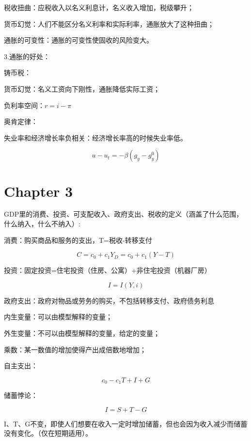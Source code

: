 \documentclass{article}
\begin{document}
税收扭曲：应税收入以名义利息计，名义收入增加，税级攀升；

货币幻觉：人们不能区分名义利率和实际利率，通胀放大了这种扭曲；

通胀的可变性：通胀的可变性使固收的风险变大。

3.通胀的好处：

铸币税：

货币幻觉：名义工资向下刚性，通胀降低实际工资；

负利率空间：$ r=i-\pi $

\hspace*{\fill}

奥肯定律：

失业率和经济增长率负相关：经济增长率高的时候失业率低。

\[
u-u_t=-\beta(g_y-g_y^0)
\]

\section{Chapter 3}

GDP里的消费、投资、可支配收入、政府支出、税收的定义（涵盖了什么范围，什么纳入，什么不纳入）:

消费：购买商品和服务的支出，T=税收-转移支付

\[
C=c_0+c_1Y_D=c_0+c_1(Y-T)
\]

投资：固定投资=住宅投资（住房、公寓）+非住宅投资（机器厂房）

\[
I=I(Y,i)
\]

政府支出：政府对物品或劳务的购买，不包括转移支付、政府债务利息

\hspace*{\fill}

内生变量：可以由模型解释的变量；

外生变量：不可以由模型解释的变量，给定的变量；

乘数：某一数值的增加使得产出成倍数地增加；

\hspace*{\fill}

自主支出：

\[
c_0-c_1T+I+G
\]

\hspace*{\fill}

储蓄悖论：

\[
I=S+T-G
\]

I、T、G不变，即使人们想要在收入一定时增加储蓄，但也会因为收入减少而储蓄没有变化。（仅在短期适用）。

\hspace*{\fill}
\end{document}
